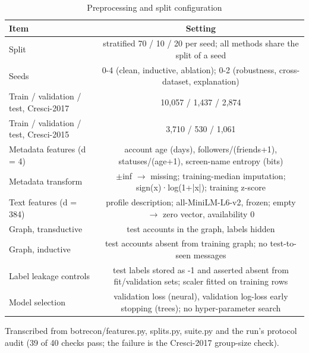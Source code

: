 \begin{table}[!t]
\caption{Preprocessing and split configuration}
\label{tab:preprocessing_splits}
\centering\footnotesize
\setlength{\tabcolsep}{3pt}
\begin{tabular}{lc}
\hline
Item & Setting \\
\hline
Split & stratified 70 / 10 / 20 per seed; all methods share the split of a seed \\
Seeds & 0-4 (clean, inductive, ablation); 0-2 (robustness, cross-dataset, explanation) \\
Train / validation / test, Cresci-2017 & 10,057 / 1,437 / 2,874 \\
Train / validation / test, Cresci-2015 & 3,710 / 530 / 1,061 \\
Metadata features (d = 4) & account age (days), followers/(friends+1), statuses/(age+1), screen-name entropy (bits) \\
Metadata transform & $\pm$inf $\rightarrow$ missing; training-median imputation; sign(x)·log(1+|x|); training z-score \\
Text features (d = 384) & profile description; all-MiniLM-L6-v2, frozen; empty $\rightarrow$ zero vector, availability 0 \\
Graph, transductive & test accounts in the graph, labels hidden \\
Graph, inductive & test accounts absent from training graph; no test-to-seen messages \\
Label leakage controls & test labels stored as -1 and asserted absent from fit/validation sets; scaler fitted on training rows \\
Model selection & validation loss (neural), validation log-loss early stopping (trees); no hyper-parameter search \\
\hline
\end{tabular}
\par\smallskip\parbox{\linewidth}{\scriptsize Transcribed from botrecon/features.py, splits.py, suite.py and the run's protocol audit (39 of 40 checks pass; the failure is the Cresci-2017 group-size check).}
\end{table}